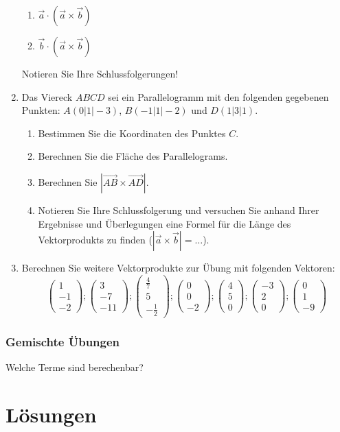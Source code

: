 \documentclass[12pt,a4paper,twoside,fleqn]{article}
\begin{document}
\begin{enumerate}
\begin{multicols}{3}
\begin{enumerate}
    \item $\vec{a}\cdot \left(\vec{a}\times\vec{b}\right)$
    \item $\vec{b}\cdot \left(\vec{a}\times\vec{b}\right)$
    \end{enumerate}
     \end{multicols}
 Notieren Sie Ihre Schlussfolgerungen!
\item Das Viereck $ABCD$ sei ein Parallelogramm mit den folgenden
  gegebenen Punkten: $A(0|1|-3)$, $B(-1|1|-2)$ und $D(1|3|1)$.
  \begin{enumerate}
  \item Bestimmen Sie die Koordinaten des Punktes $C$.%
  \item Berechnen Sie die Fläche des Parallelograms.
  \item Berechnen Sie $|\vec{AB}\times\vec{AD}|$.
  \item Notieren Sie Ihre Schlussfolgerung und versuchen Sie anhand
    Ihrer Ergebnisse und Überlegungen eine
    Formel für die Länge des Vektorprodukts zu finden
    ($|\vec{a}\times\vec{b}|=\ldots$).
  \end{enumerate}
\item Berechnen Sie weitere Vektorprodukte zur Übung mit folgenden
  Vektoren:
  $$\begin{pmatrix}
  1\\-1\\-2
\end{pmatrix};
\begin{pmatrix}
  3\\-7\\-11
\end{pmatrix};
\begin{pmatrix}
  \frac 4 7\\5\\-\frac 1 2
\end{pmatrix};
\begin{pmatrix}
  0\\0\\-2
\end{pmatrix};
\begin{pmatrix}
  4\\5\\0
\end{pmatrix};
\begin{pmatrix}
  -3\\2\\0
\end{pmatrix};
\begin{pmatrix}
  0\\1\\-9
\end{pmatrix}$$
\end{enumerate}
\section{Gemischte Übungen}
Welche Terme sind berechenbar?
\part{Lösungen}
\fontsize{10pt}{10pt}\selectfont
\setcounter{section}{0}

\end{document}
